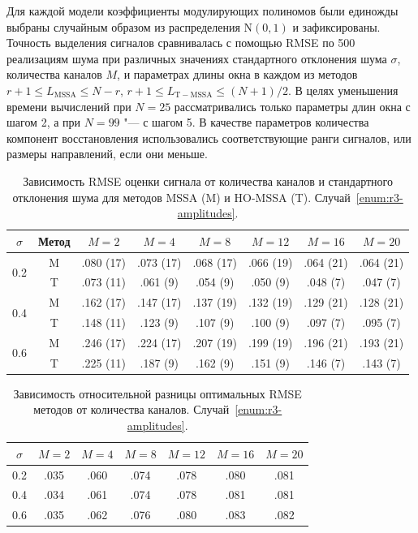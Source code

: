 \documentclass[specialist,
  substylefile = spbu.rtx,
subf,href,colorlinks=true, 12pt]{disser}
\theoremstyle{plain}
\theoremstyle{definition}
\theoremstyle{remark}
\begin{document}
Для каждой модели коэффициенты модулирующих полиномов были единожды
выбраны случайным образом из распределения $\mathrm{N}(0, 1)$ и зафиксированы.
Точность выделения сигналов сравнивалась с помощью RMSE по 500
реализациям шума при различных значениях стандартного отклонения шума
$\sigma$, количества каналов $M$, и параметрах длины окна в каждом из
методов $r + 1\leqslant L_{\mathrm{MSSA}} \leqslant N - r$, $r + 1 \leqslant
L_{\mathrm{T-MSSA}} \leqslant (N + 1) / 2$. В целях уменьшения
времени вычислений при $N = 25$ рассматривались только параметры длин
окна с шагом 2, а при $N = 99$ "--- с шагом 5.
В качестве параметров количества компонент восстановления
использовались соответствующие ранги сигналов, или размеры
направлений, если они меньше.

\begin{table}[!ht]
  \centering
  \caption{Зависимость RMSE оценки сигнала от количества каналов и
    стандартного отклонения шума для методов MSSA (M) и HO-MSSA (T).
  Случай~\ref{enum:r3-amplitudes}.}
  \label{tab:r3-rmse-amplitudes}
  \begin{tabular}{c|c|cccccc}
    $\sigma$ & Метод & $M = 2$ & $M = 4$ & $M = 8$ & $M = 12$ & $M = 16$ & $M
    = 20$ \\ \hline
    \multirow{2}{1.3em}{0.2} & M & .080 (17) & .073 (17) & .068 (17) & .066
    (19) & .064 (21) & .064 (21) \\
    & T & .073 (11) & .061 (9) & .054 (9) & .050 (9) & .048 (7) & .047 (7) \\
    \hline
    \multirow{2}{1.3em}{0.4} & M & .162 (17) & .147 (17) & .137 (19) & .132
    (19) & .129 (21) & .128 (21) \\
    & T & .148 (11) & .123 (9) & .107 (9) & .100 (9) & .097 (7) & .095 (7) \\
    \hline
    \multirow{2}{1.3em}{0.6} & M & .246 (17) & .224 (17) & .207 (19) & .199
    (19) & .196 (21) & .193 (21) \\
    & T & .225 (11) & .187 (9) & .162 (9) & .151 (9) & .146 (7) & .143 (7) \\
    \hline
  \end{tabular}
\end{table}
\begin{table}[!ht]
  \centering
  \caption{Зависимость относительной разницы оптимальных RMSE методов от
  количества каналов. Случай~\ref{enum:r3-amplitudes}.}
  \label{tab:r3-errdiff-amplitudes}
  \begin{tabular}{c|cccccc}
    $\sigma$ & $M = 2$ & $M = 4$ & $M = 8$ & $M = 12$ & $M = 16$ & $M
    = 20$ \\ \hline
    0.2 & .035 & .060 & .074 & .078 & .080 & .081 \\
    \hline
    0.4 & .034 & .061 & .074 & .078 & .081 & .081 \\
    \hline
    0.6 & .035 & .062 & .076 & .080 & .083 & .082 \\
    \hline
  \end{tabular}
\end{table}
\end{document}
